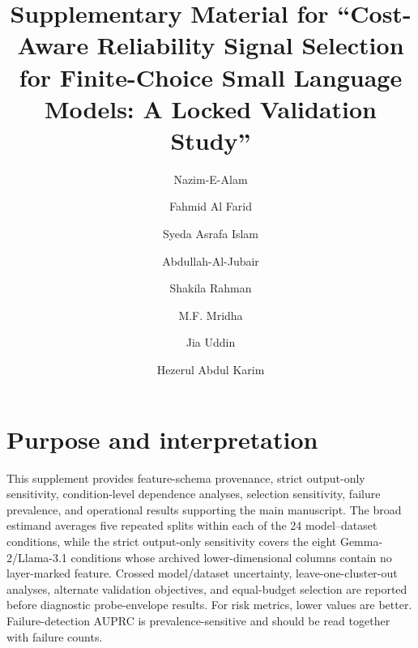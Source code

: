 \documentclass[preprint,12pt]{elsarticle}
\begin{document}
\begin{frontmatter}
\title{Supplementary Material for ``Cost-Aware Reliability Signal Selection for Finite-Choice Small Language Models: A Locked Validation Study''}
\author[aff1]{Nazim-E-Alam}
\author[aff3,aff4]{Fahmid Al Farid}
\author[aff1]{Syeda Asrafa Islam}
\author[aff1]{Abdullah-Al-Jubair}
\author[aff1]{Shakila Rahman}
\author[aff1]{M.F. Mridha}
\author[aff5]{Jia Uddin}
\author[aff2]{Hezerul Abdul Karim}


\end{frontmatter}

\section*{Purpose and interpretation}
This supplement provides feature-schema provenance, strict output-only sensitivity, condition-level dependence analyses, selection sensitivity, failure prevalence, and operational results supporting the main manuscript. The broad estimand averages five repeated splits within each of the 24 model--dataset conditions, while the strict output-only sensitivity covers the eight Gemma-2/Llama-3.1 conditions whose archived lower-dimensional columns contain no layer-marked feature. Crossed model/dataset uncertainty, leave-one-cluster-out analyses, alternate validation objectives, and equal-budget selection are reported before diagnostic probe-envelope results. For risk metrics, lower values are better. Failure-detection AUPRC is prevalence-sensitive and should be read together with failure counts.
\end{document}
